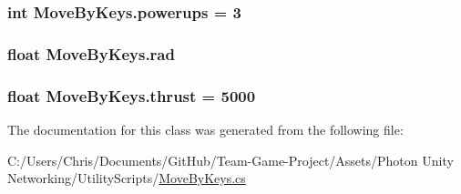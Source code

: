 \subsubsection[{\texorpdfstring{powerups}{powerups}}]{\setlength{\rightskip}{0pt plus 5cm}int Move\+By\+Keys.\+powerups = 3}\hypertarget{class_move_by_keys_aeecad27d187dfaed51bf2066fb1fab68}{}\label{class_move_by_keys_aeecad27d187dfaed51bf2066fb1fab68}
\subsubsection[{\texorpdfstring{rad}{rad}}]{\setlength{\rightskip}{0pt plus 5cm}float Move\+By\+Keys.\+rad}\hypertarget{class_move_by_keys_ab257d4fc7ebb9aa457bb19c85dc7874d}{}\label{class_move_by_keys_ab257d4fc7ebb9aa457bb19c85dc7874d}
\subsubsection[{\texorpdfstring{thrust}{thrust}}]{\setlength{\rightskip}{0pt plus 5cm}float Move\+By\+Keys.\+thrust = 5000}\hypertarget{class_move_by_keys_a5702f7b18a522ed877f1c1683e3acd6e}{}\label{class_move_by_keys_a5702f7b18a522ed877f1c1683e3acd6e}


The documentation for this class was generated from the following file\+:\begin{DoxyCompactItemize}
\item 
C\+:/\+Users/\+Chris/\+Documents/\+Git\+Hub/\+Team-\/\+Game-\/\+Project/\+Assets/\+Photon Unity Networking/\+Utility\+Scripts/\hyperlink{_move_by_keys_8cs}{Move\+By\+Keys.\+cs}\end{DoxyCompactItemize}
